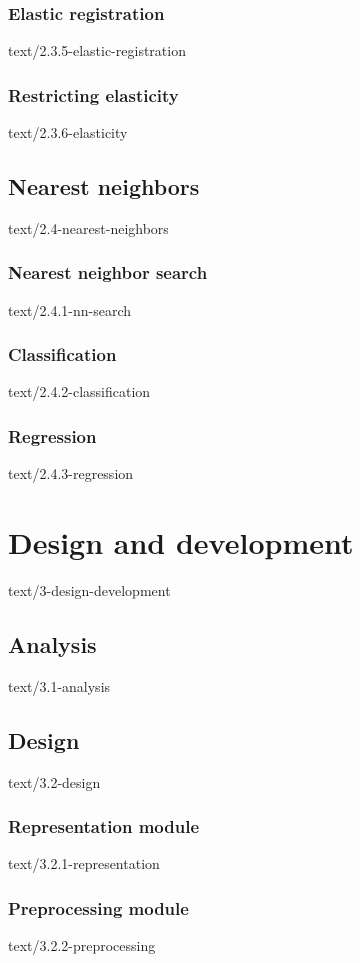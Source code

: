 \documentclass[epsbased,copyleft,final,loe, lof,extendedindex,firstnumbered,tfg,english]{tfgtfmthesisuam}
\begin{document}
  \subsection{Elastic registration\label{SEC:ELASTICREG}}{text/2.3.5-elastic-registration}
  \subsection{Restricting elasticity\label{SEC:RESTRICT}}{text/2.3.6-elasticity}

\section{Nearest neighbors\label{SEC:NEIGHBORS}}{text/2.4-nearest-neighbors}
  \subsection{Nearest neighbor search\label{SEC:SEARCH}}{text/2.4.1-nn-search}
  \subsection{Classification\label{SEC:SEARCH}}{text/2.4.2-classification}
  \subsection{Regression\label{SEC:SEARCH}}{text/2.4.3-regression}


\chapter{Design and development\label{CAP:DESIGNDEV}}{text/3-design-development}

\section{Analysis\label{SEC:ANALYSIS}}{text/3.1-analysis}
\section{Design\label{SEC:DESIGN}}{text/3.2-design}
  \subsection{Representation module\label{SEC:REPRMOD}}{text/3.2.1-representation}
  \subsection{Preprocessing module\label{SEC:PREPMOD}}{text/3.2.2-preprocessing}
\end{document}
